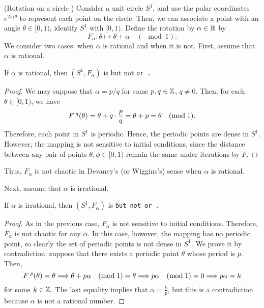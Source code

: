 \documentclass[10pt,draft,twoside]{book}
\begin{document}
\begin{example}
  (Rotation on a circle \citep{devaney})
  Consider a unit circle $S^1$, and use the polar coordinates $e^{2\pi i \theta}$ to represent each point on the circle.
  Then, we can associate a point with an angle $\theta \in [0, 1)$, identify $S^1$ with $[0,1)$. %
  Define the rotation by $\alpha \in \mathbb{R}$ by
  \begin{equation*}
    F_\alpha: \theta \mapsto \theta + \alpha \quad(\mod{1}).
  \end{equation*}
  We consider two cases: when $\alpha$ is rational and when it is not.
  First, assume that $\alpha$ is rational.
  \begin{proposition}
    If $\alpha$ is rational, then $(S^1, F_\alpha)$ is \dpp but not \tt or \sdic.
    \begin{proof}
      We may suppose that $\alpha = p/q$ for some $p, q \in \mathbb{Z}$, $q \neq 0$.
      Then, for each $\theta \in [0, 1)$, we have %
      \begin{equation*}
        F^{\;q}(\theta) = \theta + q \cdot \frac{p}{q} = \theta + p = \theta \quad(\mathrm{mod}\; \mathrm{1}).
      \end{equation*}
      Therefore, each point in $S^1$ is periodic.
      Hence, the periodic points are dense in $S^1$.
      However, the mapping is not sensitive to initial conditions, since the distance between any pair of points $\theta, \phi \in [0,1)$ remain the same under iterations by $F$.  %
    \end{proof}
  \end{proposition}
  Thus, $F_\alpha$ is not chaotic in Devaney's (or Wiggins's) sense when $\alpha$ is rational.

  Next, assume that $\alpha$ is irrational.
  \begin{proposition}
    If $\alpha$ is irrational, then $(S^1, F_\alpha)$ is \tt but not \dpp or \sdic.
    \begin{proof}
      As in the previous case, $F_\alpha$ is not sensitive to initial conditions.
      Therefore, $F_\alpha$ is not chaotic for any $\alpha$.
      In this case, however, the mapping has no periodic point, so clearly the set of periodic points is not dense in $S^1$.
      We prove it by contradiction: suppose that there exists a periodic point $\theta$ whose period is $p$.
      Then,
      \begin{equation*}
        F^{\;p}(\theta) = \theta 
        \Longrightarrow
        \theta + p\alpha \quad(\mathrm{mod}\; \mathrm{1}) = \theta
        \Longrightarrow
        p\alpha \quad(\mathrm{mod}\; \mathrm{1}) = 0
        \Longrightarrow
        p\alpha = k
      \end{equation*}
      for some $k \in \mathbb{Z}$.
      The last equality implies that $\alpha = \frac{k}{p}$, but this is a contradiction because $\alpha$ is not a rational number.


\end{proof}
\end{proposition}
\end{example}
\end{document}
